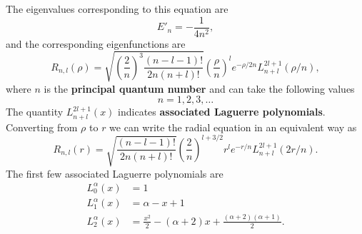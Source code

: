 \documentclass[../Main/chem331-notes.tex]{subfiles}
\begin{document}
The eigenvalues corresponding to this equation are
\begin{equation}
E'_n = - \frac{1}{4 n^2},
\end{equation}
and the corresponding eigenfunctions are
\begin{equation}
R_{n,l}(\rho) = \sqrt{\left(\frac{2}{n} \right)^{3} \frac{ (n-l-1)! }{ 2n (n+l)!} }\left(\frac{\rho}{n}\right)^l e^{-\rho/2n} L_{n+l}^{2l+1}(\rho/n),
\end{equation}
where $n$ is the \textbf{principal quantum number} and can take the following values
\begin{equation}
n = 1, 2, 3, \ldots
\end{equation}
The quantity $L_{n+l}^{2l+1}(x)$ indicates \textbf{associated Laguerre polynomials}.
Converting from $\rho$ to $r$ we can write the radial equation in an equivalent way as
\begin{equation}
R_{n,l}(r) = \sqrt{\frac{ (n-l-1)! }{ 2n (n+l)!} } \left(\frac{2}{n} \right)^{l + 3/2} r^l e^{-r/n} L_{n+l}^{2l+1}(2r/n).
\end{equation}
The first few associated Laguerre polynomials are
\begin{equation}
\begin{split}
L_0^\alpha(x) & = 1 \\
L_1^\alpha(x) & = \alpha - x + 1 \\
L_2^\alpha(x) & = \frac{x^2}{2} - (\alpha + 2) x + \frac{(\alpha + 2)(\alpha + 1)}{2}.
\end{split}
\end{equation}
\end{document}

